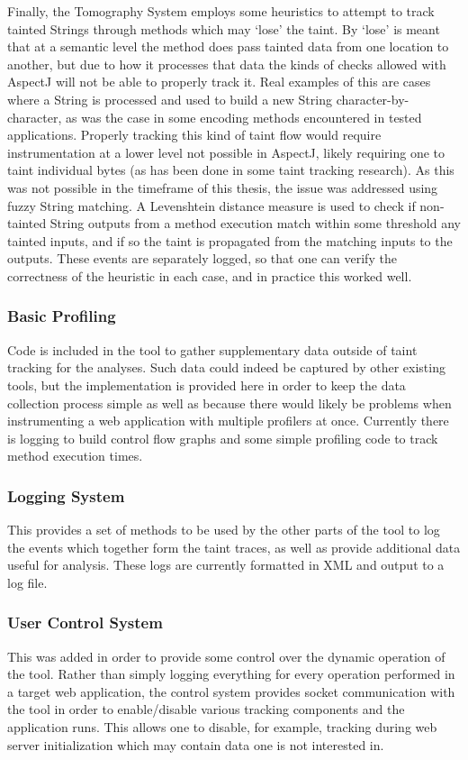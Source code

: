 \documentclass[msc,oneside]{ubcthesis}
\begin{document}
Finally, the Tomography System employs some heuristics to attempt to track tainted Strings through methods which may `lose' the taint. By `lose' is meant that at a semantic level the method does pass tainted data from one location to another, but due to how it processes that data the kinds of checks allowed with AspectJ will not be able to properly track it. Real examples of this are cases where a String is processed and used to build a new String character-by-character, as was the case in some encoding methods encountered in tested applications. Properly tracking this kind of taint flow would require instrumentation at a lower level not possible in AspectJ, likely requiring one to taint individual bytes (as has been done in some taint tracking research). As this was not possible in the timeframe of this thesis, the issue was addressed using fuzzy String matching. A Levenshtein distance measure is used to check if non-tainted String outputs from a method execution match within some threshold any tainted inputs, and if so the taint is propagated from the matching inputs to the outputs. These events are separately logged, so that one can verify the correctness of the heuristic in each case, and in practice this worked well.

\subsubsection{Basic Profiling}
Code is included in the tool to gather supplementary data outside of taint tracking for the analyses. Such data could indeed be captured by other existing tools, but the implementation is provided here in order to keep the data collection process simple as well as because there would likely be problems when instrumenting a web application with multiple profilers at once. Currently there is logging to build control flow graphs and some simple profiling code to track method execution times.

\subsubsection{Logging System}
This provides a set of methods to be used by the other parts of the tool to log the events which together form the taint traces, as well as provide additional data useful for analysis. These logs are currently formatted in XML and output to a log file.

\subsubsection{User Control System} 
This was added in order to provide some control over the dynamic operation of the tool. Rather than simply logging everything for every operation performed in a target web application, the control system provides socket communication with the tool in order to enable/disable various tracking components and the application runs. This allows one to disable, for example, tracking during web server initialization which may contain data one is not interested in.
\end{document}

